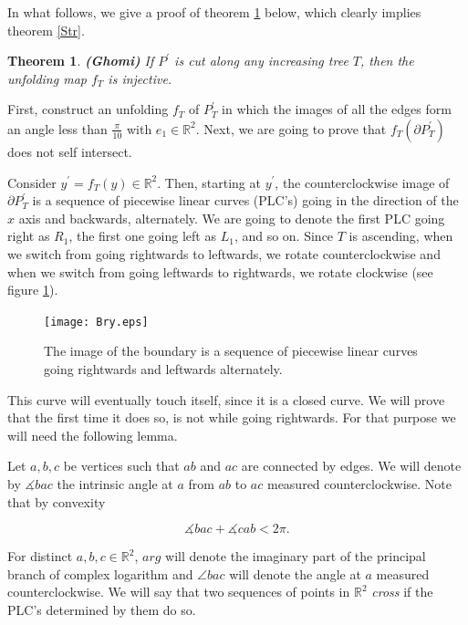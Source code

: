 \documentclass[openright, 12pt]{article}
\newtheorem{teorema}{Theorem}
\newcommand{\field}[1]{\ensuremath{\mathbb{#1}}}
\newcommand{\R}{\field{R}}
\begin{document}
In what follows, we give a proof of theorem \ref{Gho} below, which clearly implies theorem \ref{Str}. 



\begin{teorema}\label{Gho}
{\rm \textbf{(Ghomi)} If $P^{\prime}$ is cut along any increasing tree $T$, then the unfolding map $f_T$ is injective.}
\end{teorema}



First, construct an unfolding $f_T$ of $P^{\prime}_T$ in which the images of all the edges form an angle less than $\frac{\pi}{10}$ with $e_1 \in \R ^2$. Next, we are going to prove that $f_T(\partial P^{\prime}_T)$ does not self intersect.

Consider $y^{\prime} = f_T(y) \in \R ^2$. Then, starting at $y^{\prime}$, the counterclockwise image of $\partial P^{\prime}_T$ is a sequence of piecewise linear curves (PLC's) going in the direction of the $x$ axis and backwards, alternately. We are going to denote the first PLC going right as $R_1$, the first one going left as $L_1$, and so on. Since $T$ is ascending, when we switch from going rightwards to leftwards, we rotate counterclockwise and when we switch from going leftwards to rightwards, we rotate clockwise (see figure \ref{Cro}). 



\begin{figure}[h]
\centering
{}
\texttt{[image: Bry.eps]}
\caption{The image of the boundary is a sequence of piecewise linear curves going rightwards and leftwards alternately.}\label{Cro}
\end{figure}


This curve will eventually touch itself, since it is a closed curve. We will prove that the first time it does so, is not while going rightwards. For that purpose we will need the following lemma.


Let $a, b, c$ be vertices such that $ab $ and $ac$ are connected by edges. We will denote by $\measuredangle bac $ the intrinsic angle at $a $ from $ab$ to $ac$ measured counterclockwise. Note that by convexity

\begin{equation}\label{Alex}
\measuredangle bac + \measuredangle  cab  < 2\pi.
\end{equation} 

For distinct $a,b,c \in \R^2$, $arg$ will denote the imaginary part of the principal branch of complex logarithm and $\angle bac $ will denote the angle at $a$ measured counterclockwise. We will say that two sequences of points in $\R ^2$ \textit{cross} if the PLC's determined by them do so. 
\end{document}
